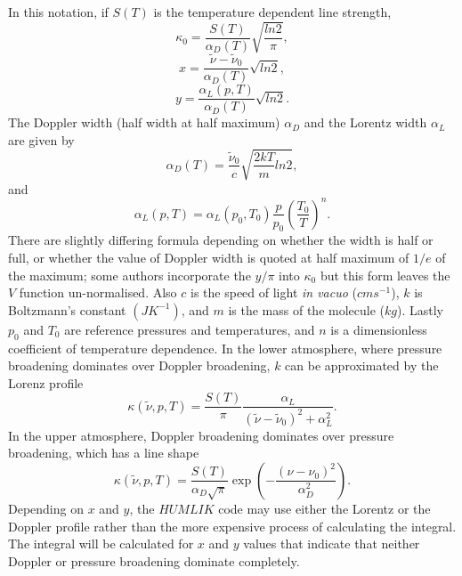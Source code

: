 \documentclass[12pt]{article}
\begin{document}
In this notation, if $S(T)$ is the temperature dependent line strength, 
\begin{equation}
   \kappa_0= \frac{S(T)}{\alpha_D(T)} \sqrt{\frac{ln2}{\pi}},
\end{equation}
\begin{equation}
   x= \frac{\tilde{\nu}-\tilde{\nu}_0}{\alpha_D(T)} \sqrt{ln2},
\end{equation}
\begin{equation}
   y= \frac{\alpha_L(p,T)}{\alpha_D(T)} \sqrt{ln2}.
\end{equation}
The Doppler width (half width at half maximum) $\alpha_D$ and the Lorentz width $\alpha_L$ are given by
\begin{equation}
   \alpha_D(T)= \frac{\tilde{\nu}_0}{c}\sqrt{ \frac{ 2 k T}{m}ln 2}, 
\end{equation}
and 
\begin{equation}
   \alpha_L(p,T)= \alpha_L(p_0,T_0)\frac{p}{p_0} \left ( \frac{T_0}{T} \right)^n.
\end{equation}
There are slightly differing formula depending on whether the width is half or full, or whether
the value of Doppler width is quoted at half maximum of $1/e$ of the maximum; some authors
incorporate the $y/\pi$ into $\kappa_0$ but this form leaves the $V$ function un-normalised.
 Also $c$ is the speed of light {\em in vacuo} ($ cm s^{-1}$), $k$ is Boltzmann's
constant $(J K^{-1})$, and $m$ is the mass of the molecule ($kg$). Lastly $p_0$ and $T_0$
are reference pressures and temperatures, and $n$ is a dimensionless 
coefficient of temperature dependence. In the lower atmosphere, where pressure broadening dominates over Doppler
broadening, $k$ can be approximated by the Lorenz profile
\begin{equation}
    \kappa(\tilde{\nu},p,T)=\frac{S(T)}{\pi} \frac{\alpha_L}{ (\tilde{\nu}-\tilde{\nu}_0)^2+\alpha_L^2}.
\end{equation}
In the upper atmosphere, Doppler broadening dominates over pressure broadening, which has a line shape
\begin{equation}
    \kappa(\tilde{\nu},p,T)=\frac{S(T)}{\alpha_D \sqrt{\pi}}  \exp{\left (-\frac{(\nu-\nu_0)^2}{\alpha^2_D}\right )}. 
\end{equation}
Depending on $x$ and $y$, the $HUMLIK$ code may use either the Lorentz or the Doppler profile rather
than the more expensive process of  calculating the integral. The integral will be calculated for $x$ and $y$ values
that indicate that neither Doppler or pressure broadening dominate completely.
\end{document}
